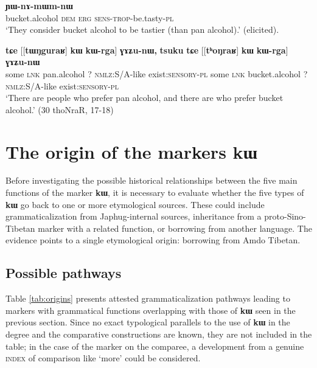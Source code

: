 \documentclass[oldfontcommands,oneside,a4paper,11pt]{article}
\newcommand{\ipa}[1]{{\phon\textbf{#1}}}
\begin{document}
\begin{exe}
\ex \label{ex:nAmWm}
\gll  [\ipa{tʰoŋraʁ} 	\ipa{nɯ}] 	\ipa{kɯ} 	\ipa{ɲɯ-nɤ-mɯm-nɯ} \\
 bucket.alcohol \textsc{dem} \textsc{erg}  \textsc{sens-trop}-be.tasty-\textsc{pl} \\
 \glt `They consider  bucket alcohol to be tastier (than pan alcohol).'  (elicited).
\end{exe}

\begin{exe}
\ex \label{ex:kWrga}
\gll \ipa{tsuku}   	\ipa{tɕe}   	 [[\ipa{tɯŋguraʁ}]   	\ipa{kɯ}   	\ipa{kɯ-rga}]   	\ipa{ɣɤʑu-nɯ,}   		\ipa{tsuku}   	\ipa{tɕe}   	[[\ipa{tʰoŋraʁ}]   	\ipa{kɯ}   	\ipa{kɯ-rga}]   	\ipa{ɣɤʑu-nɯ}   \\
some \textsc{lnk} pan.alcohol ?{ } \textsc{nmlz:S/A}-like exist\textsc{:sensory}-\textsc{pl} some \textsc{lnk} bucket.alcohol ?{ } \textsc{nmlz:S/A}-like exist\textsc{:sensory}-\textsc{pl} \\
\glt `There are people who prefer pan alcohol, and there are who prefer bucket alcohol.' (30 thoNraR, 17-18)
\end{exe}


%
 
 
 
 \section{The origin of the markers \ipa{kɯ}}
Before investigating the possible historical relationships between the five main functions of the marker \ipa{kɯ},  it is necessary to evaluate whether the five types of \ipa{kɯ} go back to one or more etymological sources. These could include grammaticalization from Japhug-internal sources,  inheritance from a proto-Sino-Tibetan  marker with a related function, or borrowing from another language. The evidence points to a single etymological origin: borrowing from Amdo Tibetan.

\subsection{Possible pathways}
Table \ref{tab:origins} presents attested grammaticalization pathways leading to markers with grammatical functions overlapping with those of \ipa{kɯ} seen in the previous section. Since no exact typological parallels  to the use of \ipa{kɯ} in the degree and the comparative constructions are known, they are not included in the table; in the case of the marker on the comparee, a development from a genuine \textsc{index} of comparison like `more'  could be considered.
\end{document}
